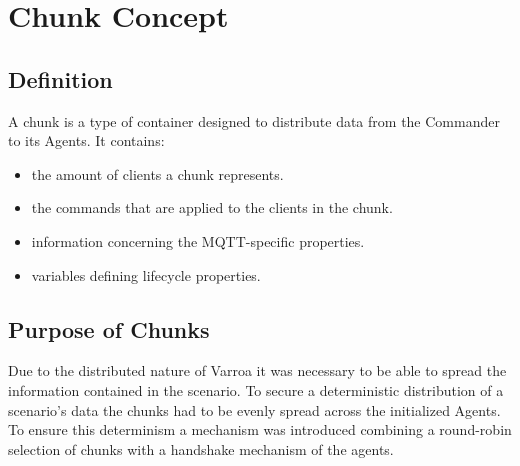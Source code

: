 \chapter{Chunk Concept}
\section{Definition}
A chunk is a type of container designed to distribute data from the Commander to its Agents.
It contains:
\begin{itemize}
	\item the amount of clients a chunk represents.
	\item the commands that are applied to the clients in the chunk.
	\item information concerning the MQTT-specific properties.
	\item variables defining lifecycle properties.
\end{itemize}

\section{Purpose of Chunks}
Due to the distributed nature of Varroa it was necessary to be able to spread the information contained in the scenario.
To secure a deterministic distribution of a scenario's data the chunks had to be evenly spread across the initialized Agents.
To ensure this determinism a mechanism was introduced combining a round-robin selection of chunks with a handshake mechanism of the agents.





